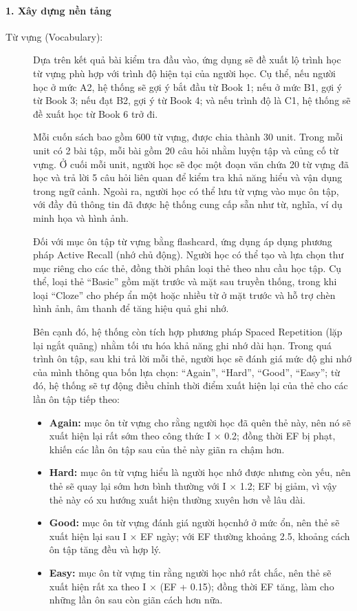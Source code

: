 \documentclass[a4paper,12pt]{extreport}
\begin{document}
\paragraph{1. Xây dựng nền tảng}
\begin{description}
    \item[Từ vựng (Vocabulary):] Dựa trên kết quả bài kiểm tra đầu vào, ứng dụng sẽ đề xuất lộ trình học từ vựng phù hợp với trình độ hiện tại của người học. Cụ thể, nếu người học ở mức A2, hệ thống sẽ gợi ý bắt đầu từ Book 1; nếu ở mức B1, gợi ý từ Book 3; nếu đạt B2, gợi ý từ Book 4; và nếu trình độ là C1, hệ thống sẽ đề xuất học từ Book 6 trở đi. 

Mỗi cuốn sách bao gồm 600 từ vựng, được chia thành 30 unit. Trong mỗi unit có 2 bài tập, mỗi bài gồm 20 câu hỏi nhằm luyện tập và củng cố từ vựng. Ở cuối mỗi unit, người học sẽ đọc một đoạn văn chứa 20 từ vựng đã học và trả lời 5 câu hỏi liên quan để kiểm tra khả năng hiểu và vận dụng trong ngữ cảnh. Ngoài ra, người học có thể lưu từ vựng vào mục ôn tập, với đầy đủ thông tin đã được hệ thống cung cấp sẵn như từ, nghĩa, ví dụ minh họa và hình ảnh. 

Đối với mục ôn tập từ vựng bằng flashcard, ứng dụng áp dụng phương pháp Active Recall (nhớ chủ động). Người học có thể tạo và lựa chọn thư mục riêng cho các thẻ, đồng thời phân loại thẻ theo nhu cầu học tập. Cụ thể, loại thẻ “Basic” gồm mặt trước và mặt sau truyền thống, trong khi loại “Cloze” cho phép ẩn một hoặc nhiều từ ở mặt trước và hỗ trợ chèn hình ảnh, âm thanh để tăng hiệu quả ghi nhớ. 

Bên cạnh đó, hệ thống còn tích hợp phương pháp Spaced Repetition (lặp lại ngắt quãng) nhằm tối ưu hóa khả năng ghi nhớ dài hạn. Trong quá trình ôn tập, sau khi trả lời mỗi thẻ, người học sẽ đánh giá mức độ ghi nhớ của mình thông qua bốn lựa chọn: “Again”, “Hard”, “Good”, “Easy”; từ đó, hệ thống sẽ tự động điều chỉnh thời điểm xuất hiện lại của thẻ cho các lần ôn tập tiếp theo: 

\begin{itemize}
    \item \textbf{Again:} mục ôn từ vựng cho rằng người học đã quên thẻ này, nên nó sẽ xuất hiện lại rất sớm theo công thức I × 0.2; đồng thời EF bị phạt, khiến các lần ôn tập sau của thẻ này giãn ra chậm hơn.
    \item \textbf{Hard:} mục ôn từ vựng hiểu là người học nhớ được nhưng còn yếu, nên thẻ sẽ quay lại sớm hơn bình thường với I × 1.2; EF bị giảm, vì vậy thẻ này có xu hướng xuất hiện thường xuyên hơn về lâu dài.
    \item \textbf{Good:} mục ôn từ vựng đánh giá người họcnhớ ở mức ổn, nên thẻ sẽ xuất hiện lại sau I × EF ngày; với EF thường khoảng 2.5, khoảng cách ôn tập tăng đều và hợp lý.
    \item \textbf{Easy:} mục ôn từ vựng tin rằng người học nhớ rất chắc, nên thẻ sẽ xuất hiện rất xa theo I × (EF + 0.15); đồng thời EF tăng, làm cho những lần ôn sau còn giãn cách hơn nữa.
\end{itemize}


\end{description}
\end{document}
